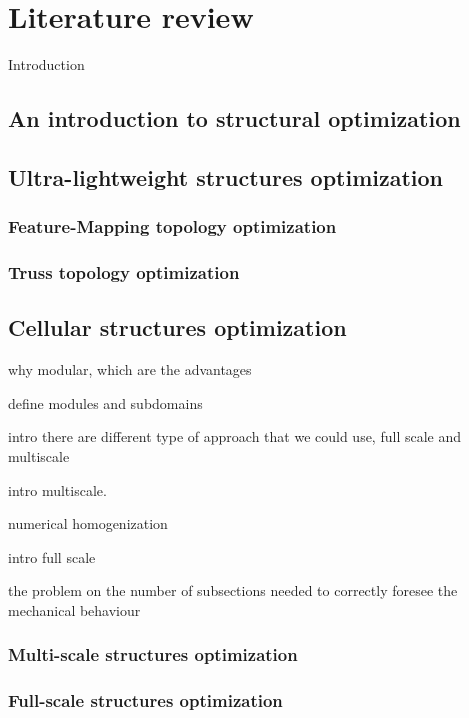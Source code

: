 \setchapterpreamble[u]{\margintoc}
\glsresetall %

\chapter{Literature review}
Introduction
\section{An introduction to structural optimization}

\section{Ultra-lightweight structures optimization}

\subsection{Feature-Mapping topology optimization}

\subsection{Truss topology optimization}

\section{Cellular structures optimization}
why modular, which are the advantages

define modules and subdomains

intro there are different type of approach that we could use, full scale and multiscale

intro multiscale.

numerical homogenization

intro full scale

the problem on the number of subsections needed to correctly foresee the mechanical behaviour

\subsection{Multi-scale structures optimization}

\subsection{Full-scale structures optimization}